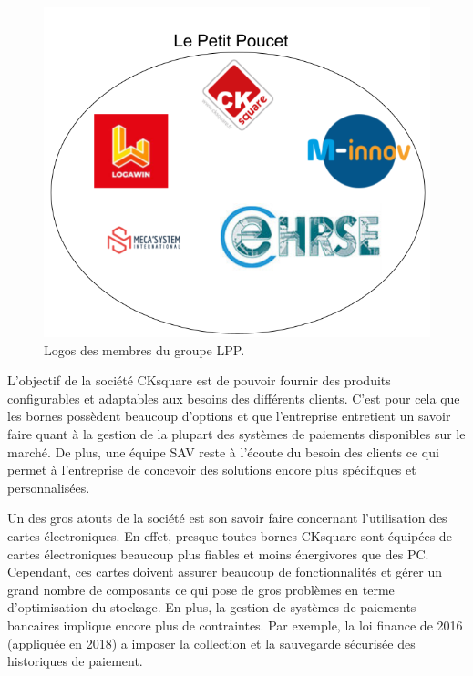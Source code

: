 \documentclass[a4paper]{article}
\begin{document}
\begin{figure}[h!]
  \begin{center}
  \includegraphics[scale=0.4]{./img/lpp-logos.png}
  \caption{Logos des membres du groupe LPP.}
    \label{lpp-logos}
  \end{center}
\end{figure}

L'objectif de la société CKsquare est de pouvoir fournir des produits
configurables et adaptables aux besoins des différents clients. C'est pour cela
que les bornes possèdent beaucoup d'options et que l'entreprise entretient un
savoir faire quant à la gestion de la plupart des systèmes de paiements
disponibles sur le marché. De plus, une équipe SAV reste à l'écoute du besoin
des clients ce qui permet à l'entreprise de concevoir des solutions encore plus
spécifiques et personnalisées.

Un des gros atouts de la société est son savoir faire concernant l'utilisation
des cartes électroniques. En effet, presque toutes bornes CKsquare sont équipées
de cartes électroniques beaucoup plus fiables et moins énergivores que des PC.
Cependant, ces cartes doivent assurer beaucoup de fonctionnalités et gérer un
grand nombre de composants ce qui pose de gros problèmes en terme d'optimisation
du stockage. En plus, la gestion de systèmes de paiements bancaires implique
encore plus de contraintes. Par exemple, la loi finance de 2016 (appliquée en
2018) a imposer la collection et la sauvegarde sécurisée des historiques de
paiement.
\end{document}

